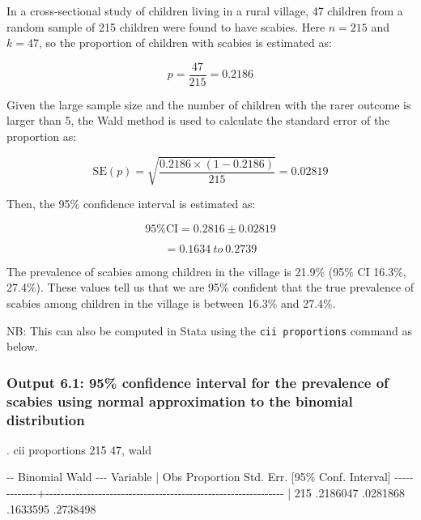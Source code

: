 \documentclass[
]{memoir}
\newenvironment{Shaded}{\begin{snugshade}}{\end{snugshade}}
\newcommand{\NormalTok}[1]{#1}
\begin{document}
In a cross-sectional study of children living in a rural village, 47 children from a random sample of 215 children were found to have scabies. Here \(n=215\) and \(k=47\), so the proportion of children with scabies is estimated as:

\[ p = \frac{47}{215} = 0.2186 \]

Given the large sample size and the number of children with the rarer outcome is larger than 5, the Wald method is used to calculate the standard error of the proportion as:

\[{\text{SE}\left( p \right) = \sqrt{\frac{0.2186 \times (1 - 0.2186)}{215}}
}{= 0.02819}\]

Then, the 95\% confidence interval is estimated as:

\[\text{95\% CI} = 0.2816 \pm 0.02819\]

\[= 0.1634\ to\ 0.2739\]

The prevalence of scabies among children in the village is 21.9\% (95\% CI 16.3\%, 27.4\%). These values tell us that we are 95\% confident that the true prevalence of scabies among children in the village is between 16.3\% and 27.4\%.

NB: This can also be computed in Stata using the \texttt{cii\ proportions} command as below.

\hypertarget{output-6.1-95-confidence-interval-for-the-prevalence-of-scabies-using-normal-approximation-to-the-binomial-distribution}{%
\subsubsection{Output 6.1: 95\% confidence interval for the prevalence of scabies using normal approximation to the binomial distribution}\label{output-6.1-95-confidence-interval-for-the-prevalence-of-scabies-using-normal-approximation-to-the-binomial-distribution}}

\begin{Shaded}
\begin{Highlighting}[]
\NormalTok{. cii proportions 215 47, wald}

\NormalTok{                                                         {-}{-} Binomial Wald {-}{-}{-}}
\NormalTok{    Variable |        Obs  Proportion    Std. Err.       [95\% Conf. Interval]}
\NormalTok{{-}{-}{-}{-}{-}{-}{-}{-}{-}{-}{-}{-}{-}+{-}{-}{-}{-}{-}{-}{-}{-}{-}{-}{-}{-}{-}{-}{-}{-}{-}{-}{-}{-}{-}{-}{-}{-}{-}{-}{-}{-}{-}{-}{-}{-}{-}{-}{-}{-}{-}{-}{-}{-}{-}{-}{-}{-}{-}{-}{-}{-}{-}{-}{-}{-}{-}{-}{-}{-}{-}{-}{-}{-}{-}{-}{-}}
\NormalTok{             |        215    .2186047    .0281868        .1633595    .2738498}
\end{Highlighting}
\end{Shaded}
\end{document}
